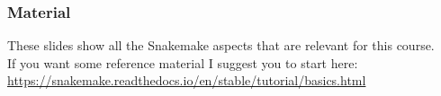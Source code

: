 \documentclass[xcolor=table]{beamer}
\begin{document}
\begin{frame}
\frametitle{Material}
These slides show all the Snakemake aspects that are relevant for this course. \\ If you want some reference material I suggest
you to start here: \url{https://snakemake.readthedocs.io/en/stable/tutorial/basics.html}
\end{frame}

\end{document}

